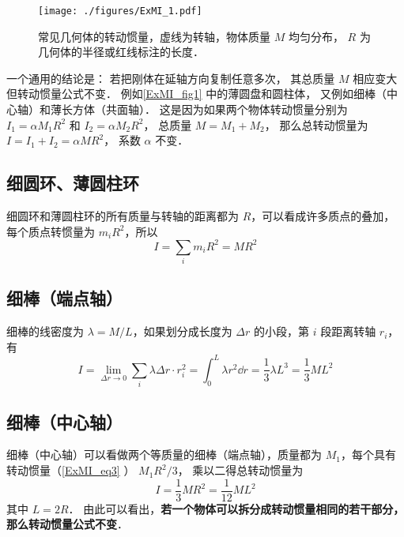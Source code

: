 

\begin{figure}[ht]
\centering
\texttt{[image: ./figures/ExMI\_1.pdf]}
\caption{常见几何体的转动惯量，虚线为转轴，物体质量 $M$ 均匀分布， $R$ 为几何体的半径或红线标注的长度．}\label{ExMI_fig1}
\end{figure}

一个通用的结论是： 若把刚体在延轴方向复制任意多次， 其总质量 $M$ 相应变大但转动惯量公式不变． 例如\autoref{ExMI_fig1} 中的薄圆盘和圆柱体， 又例如细棒（中心轴）和薄长方体（共面轴）． 这是因为如果两个物体转动惯量分别为 $I_1 = \alpha M_1 R^2$ 和 $I_2 = \alpha M_2 R^2$， 总质量 $M = M_1 + M_2$， 那么总转动惯量为 $I = I_1 + I_2 = \alpha M R^2$， 系数 $\alpha$ 不变．

\subsection{细圆环、薄圆柱环}
细圆环和薄圆柱环的所有质量与转轴的距离都为 $R$，可以看成许多质点的叠加，每个质点转惯量为 $m_i R^2$，所以
\begin{equation}\label{ExMI_eq4}
I = \sum_i m_i R^2 = M R^2
\end{equation}

\subsection{ 细棒（端点轴）}
细棒的线密度为 $\lambda  = M/L$，如果划分成长度为 $\Delta r$ 的小段，第 $i$ 段距离转轴 $r_i$， 有
\begin{equation}\label{ExMI_eq3}
I = \lim_{\Delta r \to 0}\sum_i \lambda\Delta r \cdot r_i^2 =  \int_0^L \lambda r^2 \dd{r} = \frac{1}{3}\lambda L^3 = \frac{1}{3}M L^2
\end{equation}

\subsection{细棒（中心轴）}
细棒（中心轴）可以看做两个等质量的细棒（端点轴），质量都为 $M_1$，每个具有转动惯量（\autoref{ExMI_eq3} ） $M_1 R^2/3$， 乘以二得总转动惯量为
\begin{equation}\label{ExMI_eq2}
I = \frac{1}{3} MR^2 = \frac{1}{12}ML^2
\end{equation}
其中 $L=2R$． 由此可以看出，\textbf{若一个物体可以拆分成转动惯量相同的若干部分，那么转动惯量公式不变}．

